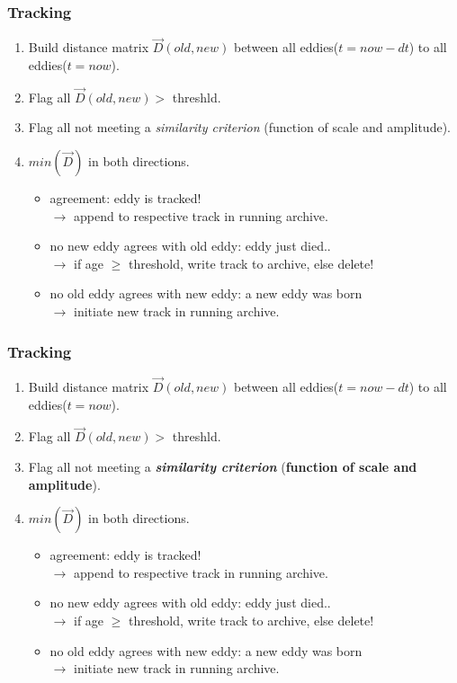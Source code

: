 
\begin{frame}
 \frametitle{Tracking}
\begin{enumerate}
\item
Build distance matrix $\vec{D}(old,new)$ between all eddies($t=now-dt$) to all eddies($t=now$).
\item
Flag all $\vec{D}(old,new) > $ threshld.
\item
Flag all not meeting a \textit{similarity criterion} (function of scale and amplitude).
\item
$min(\vec{D})$ in both directions.
\begin{itemize}
\item
agreement: eddy is tracked!\\
$\rightarrow$ append to respective track in running archive.
\item
no new eddy agrees with old eddy: eddy just died..\\
$\rightarrow$ if age $\ge$ threshold, write track to archive, else delete!
\item
no old eddy agrees with new eddy: a new eddy was born\\
$\rightarrow$ initiate new track in running archive.
\end{itemize}
\end{enumerate}
\end{frame}


\begin{frame}[noframenumbering]
 \frametitle{Tracking}
\begin{enumerate}
\item
Build distance matrix $\vec{D}(old,new)$ between all eddies($t=now-dt$) to all eddies($t=now$).
\item
Flag all $\vec{D}(old,new) > $ threshld.
\item
Flag all not meeting a \textbf{\textit{similarity criterion}} (\textbf{function of scale and amplitude}).
\item
$min(\vec{D})$ in both directions.
\begin{itemize}
\item
agreement: eddy is tracked!\\
$\rightarrow$ append to respective track in running archive.
\item
no new eddy agrees with old eddy: eddy just died..\\
$\rightarrow$ if age $\ge$ threshold, write track to archive, else delete!
\item
no old eddy agrees with new eddy: a new eddy was born\\
$\rightarrow$ initiate new track in running archive.
\end{itemize}
\end{enumerate}
\end{frame}


